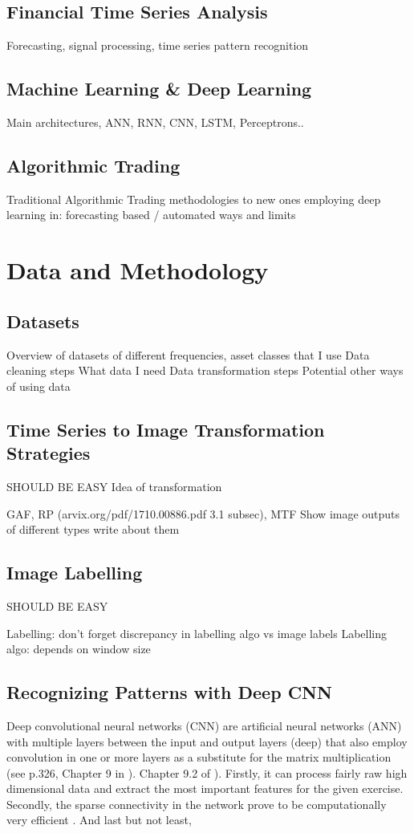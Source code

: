 \documentclass[11pt, a4paper]{article}
\begin{document}
\subsection{Financial Time Series Analysis}
Forecasting, signal processing, time series pattern recognition

\subsection{Machine Learning \& Deep Learning}
\label{RW:ML&DL}

Main architectures, ANN, RNN, CNN, LSTM, Perceptrons..


\subsection{Algorithmic Trading}
Traditional Algorithmic Trading methodologies to new ones employing deep learning in: forecasting based / automated ways and limits

\section{Data and Methodology}
\subsection{Datasets}
Overview of datasets of different frequencies, asset classes that I use
Data cleaning steps
What data I need
Data transformation steps 
Potential other ways of using data

\subsection{Time Series to Image Transformation Strategies}
SHOULD BE EASY
Idea of transformation

GAF, RP (arvix.org/pdf/1710.00886.pdf 3.1 subsec), MTF
Show image outputs of different types
write about them 

\subsection{Image Labelling}
SHOULD BE EASY

Labelling: don't forget discrepancy in labelling algo vs image labels
Labelling algo: depends on window size

\subsection{Recognizing Patterns with Deep CNN}
\label{D&M:RecPatwCNN}
Deep convolutional neural networks (CNN) are artificial neural networks (ANN) with multiple layers between the input and output layers (deep) that also employ convolution in one or more layers 
as a substitute for the matrix multiplication (see p.326, Chapter 9 in \cite{goodfellow2016deep}). 
Chapter 9.2 of \cite{goodfellow2016deep}). 
Firstly, it can process fairly raw high dimensional data and extract the most important features for the given exercise. Secondly, the sparse connectivity in the network prove to be computationally very efficient . And last but not least, 
\end{document}
